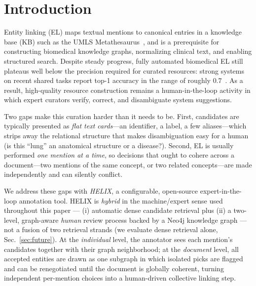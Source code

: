 \documentclass[runningheads]{llncs}
\begin{document}
\section{Introduction}
\label{sec:intro}

Entity linking (EL) maps textual mentions to canonical entries in a knowledge
base (KB) such as the UMLS Metathesaurus~\cite{umls}, and is a prerequisite for
constructing biomedical knowledge graphs, normalizing clinical text, and
enabling structured search. Despite steady progress, fully automated biomedical
EL still plateaus well below the precision required for curated resources: strong
systems on recent shared tasks report top-1 accuracy in the range of roughly
$0.7$~\cite{bionne,belb}. As a result, high-quality resource construction remains
a human-in-the-loop activity in which expert curators verify, correct, and
disambiguate system suggestions.

Two gaps make this curation harder than it needs to be. First,
candidates are typically presented as \emph{flat text cards}---an identifier, a
label, a few aliases---which strips away the relational structure that makes
disambiguation easy for a human (is this ``lung'' an anatomical structure or a
disease?). Second, EL is usually performed \emph{one mention at a time}, so
decisions that ought to cohere across a document---two mentions of the same
concept, or two related concepts---are made independently and can silently
conflict.

We address these gaps with \emph{HELIX}, a configurable, open-source
expert-in-the-loop annotation tool. HELIX is \emph{hybrid} in the machine/expert
sense used throughout this paper --- (i) automatic dense candidate retrieval plus
(ii) a two-level, graph-aware \emph{human} review process backed by a Neo4j knowledge
graph --- not a fusion of two retrieval strands (we evaluate dense retrieval alone,
Sec.~\ref{sec:future}). At the \emph{individual} level, the annotator sees each
mention's candidates together with their graph neighborhood; at the
\emph{document} level, all accepted entities are drawn as one subgraph in which
isolated picks are flagged and can be renegotiated until the document is globally
coherent, turning independent per-mention choices into a human-driven collective
linking step.
\end{document}
